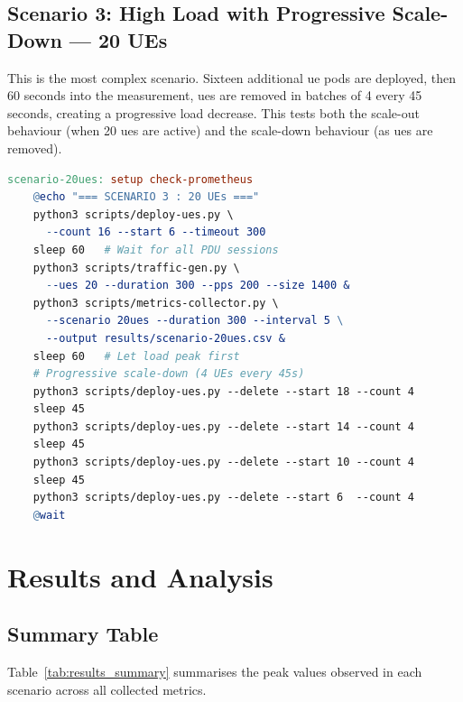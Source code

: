 \subsection{Scenario 3: High Load with Progressive Scale-Down — 20 UEs}

This is the most complex scenario. Sixteen additional \gls{ue} pods are deployed, then 60 seconds into the measurement, \glspl{ue} are removed in batches of 4 every 45 seconds, creating a progressive load decrease. This tests both the scale-out behaviour (when 20 \glspl{ue} are active) and the scale-down behaviour (as \glspl{ue} are removed).

\begin{lstlisting}[language=make, caption={Makefile target for the 20-UE progressive scale-down scenario}, label={lst:scenario_20ues}]
scenario-20ues: setup check-prometheus
    @echo "=== SCENARIO 3 : 20 UEs ==="
    python3 scripts/deploy-ues.py \
      --count 16 --start 6 --timeout 300
    sleep 60   # Wait for all PDU sessions
    python3 scripts/traffic-gen.py \
      --ues 20 --duration 300 --pps 200 --size 1400 &
    python3 scripts/metrics-collector.py \
      --scenario 20ues --duration 300 --interval 5 \
      --output results/scenario-20ues.csv &
    sleep 60   # Let load peak first
    # Progressive scale-down (4 UEs every 45s)
    python3 scripts/deploy-ues.py --delete --start 18 --count 4
    sleep 45
    python3 scripts/deploy-ues.py --delete --start 14 --count 4
    sleep 45
    python3 scripts/deploy-ues.py --delete --start 10 --count 4
    sleep 45
    python3 scripts/deploy-ues.py --delete --start 6  --count 4
    @wait
\end{lstlisting}

\section{Results and Analysis}
\label{sec:results}

\subsection{Summary Table}

Table~\ref{tab:results_summary} summarises the peak values observed in each scenario across all collected metrics.

